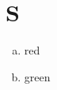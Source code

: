 \documentclass{lmcs}
\begin{document}
\section{S}
\begin{enumerate}[(a)]
\item red
\item green
\end{enumerate}
\end{document}
